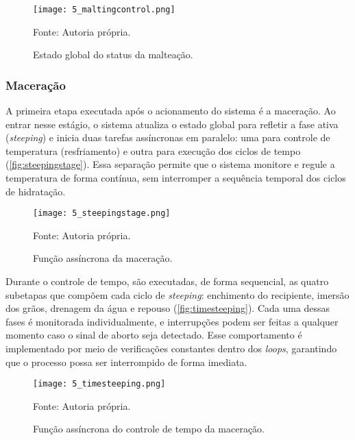 \begin{figure}[ht]
    \centering
    \caption{Estado global do status da malteação.}
    \label{fig:maltingcontrol}
    \texttt{[image: 5\_maltingcontrol.png]}

    {\centering\footnotesize Fonte: Autoria própria.\par}
\end{figure}

\subsubsection{Maceração}

A primeira etapa executada após o acionamento do sistema é a maceração. Ao entrar nesse estágio, o sistema atualiza o estado global para refletir a fase ativa (\textit{steeping}) e inicia duas tarefas assíncronas em paralelo: uma para controle de temperatura (resfriamento) e outra para execução dos ciclos de tempo (\autoref{fig:steepingstage}). Essa separação permite que o sistema monitore e regule a temperatura de forma contínua, sem interromper a sequência temporal dos ciclos de hidratação.

\begin{figure}[ht]
    \centering
    \caption{Função assíncrona da maceração.}
    \label{fig:steepingstage}
    \texttt{[image: 5\_steepingstage.png]}

    {\centering\footnotesize Fonte: Autoria própria.\par}
\end{figure}

Durante o controle de tempo, são executadas, de forma sequencial, as quatro subetapas que compõem cada ciclo de \textit{steeping}: enchimento do recipiente, imersão dos grãos, drenagem da água e repouso (\autoref{fig:timesteeping}). Cada uma dessas fases é monitorada individualmente, e interrupções podem ser feitas a qualquer momento caso o sinal de aborto seja detectado. Esse comportamento é implementado por meio de verificações constantes dentro dos \textit{loops}, garantindo que o processo possa ser interrompido de forma imediata.

\begin{figure}[ht]
    \centering
    \caption{Função assíncrona do controle de tempo da maceração.}
    \label{fig:timesteeping}
    \texttt{[image: 5\_timesteeping.png]}

    {\centering\footnotesize Fonte: Autoria própria.\par}
\end{figure}

